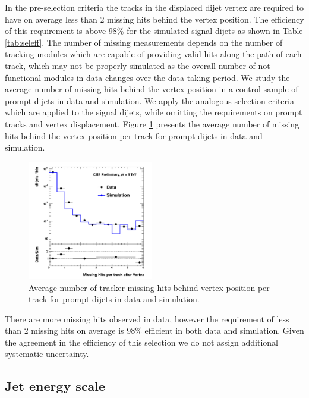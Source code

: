 In the pre-selection criteria the tracks in the displaced dijet vertex are required to have on average
 less than 2 missing hits behind the vertex position. The efficiency of this requirement is above 98\% 
for the simulated signal dijets as shown in Table \ref{tab:seleff}. 
The number of missing measurements depends on the number of tracking modules which are capable of providing
valid hits along the path of each track, which may not be properly simulated as the overall number of 
not functional modules in data changes over the data taking period. We study the average number of missing
hits behind the vertex position in a control sample of prompt dijets in data and simulation. We apply the
analogous selection criteria which are applied to the signal dijets,
 while omitting the requirements on prompt tracks and vertex displacement. Figure \ref{fig:misshits} presents
the average number of missing hits behind the vertex position per track for prompt dijets in data and simulation.

\begin{figure}[htbp]
\centering
\includegraphics[width=0.49\textwidth]{plots/misshits/misshits.pdf}
\caption{Average number of tracker missing hits behind vertex position per track for prompt dijets
in data and simulation.\label{fig:misshits}}
\end{figure}

There are more missing hits observed in data, however the requirement of less than 2
missing hits on average is 98\% efficient in both data and simulation. Given the agreement in the efficiency
of this selection we do not assign additional systematic uncertainty. 

\subsection{Jet energy scale}
\label{subsec:jessys}

